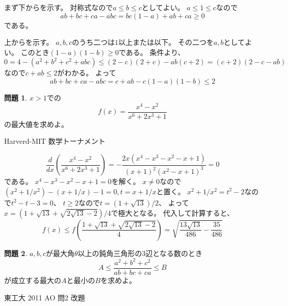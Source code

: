 \documentclass[uplatex, a5paper]{jsarticle}
\makeatletter
\theoremstyle{definition}
\newtheorem{prob}{問題}
\renewenvironment{proof}[1][\proofname]{
  \pushQED{\qed}%
  \normalfont \topsep6\p@\@plus6\p@\relax
  \trivlist
  \item[\hskip\labelsep
    #1\@addpunct{\textbf{.}}]\ignorespaces
}{%
  \popQED\endtrivlist\@endpefalse
}
\providecommand{\proofname}{証明}
\def\qed{\hfill $\Box$}
\makeatother
\begin{document}
\begin{proof}
  まず下からを示す。
  対称式なので\(a\leq b \leq c\)としてよい。
  \(a\leq 1 \leq c\)なので
  \[
  ab+bc+ca-abc= bc(1-a) + ab+ca \geq 0
  \]
  である。

  上からを示す。
  \(a,b,c\)のうち二つは\(1\)以上または以下。
  その二つを\(a,b\)としてよい。
  このとき\((1-a)(1-b) \geq 0\)である。
  条件より、
  \(0 = 4-(a^2+b^2+c^2+abc) \leq (2-c)(2+c) - ab(c+2) = (c+2)(2-c-ab)\)
  なので\(c+ab \leq 2\)がわかる。
  よって
  \[
  ab+bc+ca-abc = c + ab - c(1-a)(1-b) \leq 2
  \]
\end{proof}












\newpage


\begin{prob}
  \(x>1\)での
  \[
  f(x) = \frac{x^4-x^2}{x^6+2x^3+1}
  \]
  の最大値を求めよ。
  \begin{flushright}
    Harverd-MIT 数学トーナメント
  \end{flushright}
\end{prob}


\begin{proof}
  \[
  \frac{d}{dx}\left( \frac{x^4-x^2}{x^6+2x^3+1} \right)
  = - \frac{2x(x^4 - x^3 - x^2 - x + 1 ) }{ (x+1)^2(x^2 -x +1)^3 } = 0
  \]
  である。
  \(x^4 - x^3 - x^2 - x + 1 = 0\)を解く。
  \(x \neq 0\)なので\((x^2 + 1/x^2 ) - (x+1/x) -1=0 , t = x+1/x\)と置く。
  \(x^2 + 1/x^2 = t^2 -2\)なので\(t^2 -t -3 =0\)、
  \(t \geq 2\)なので\(t = ( 1 + \sqrt{ 13 } ) / 2\)、
  よって\(x = ( 1 + \sqrt{13} + \sqrt{ 2 \sqrt{ 13 } - 2 } ) / 4\)で極大となる。
  代入して計算すると、
  \[
  f(x) \leq f\left( \frac{ 1 + \sqrt{13} + \sqrt{ 2 \sqrt{ 13 } - 2 } }{ 4 } \right)
  = \sqrt{ \frac{13\sqrt{13}}{486} -\frac{35}{486} }
  \]
\end{proof}











\newpage

\begin{prob}
  \(a,b,c\)が最大角\(\theta\)以上の鈍角三角形の\(3\)辺となる数のとき
  \[
  A \leq \frac{a^2+b^2+c^2}{ab+bc+ca} \leq B
  \]
  が成立する最大の\(A\)と最小の\(B\)を求めよ。
  \begin{flushright}
    東工大 2011 AO 問2 改題
  \end{flushright}
\end{prob}
\end{document}
